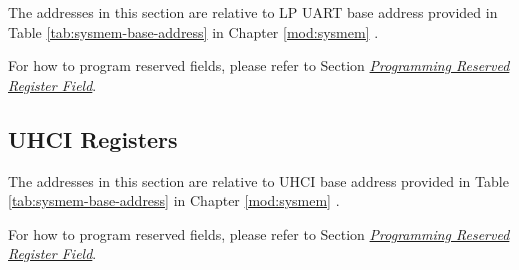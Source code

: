 \documentclass[main\_\_EN.tex]{subfiles}
\begin{document}
The addresses in this section are relative to LP UART base address provided in Table \ref{tab:sysmem-base-address} in Chapter \ref{mod:sysmem} \textit{}.

For how to program reserved fields, please refer to Section \hyperref[programming-reserved-field]{\textit{Programming Reserved Register Field}}.




\clearpage
\subsection{UHCI Registers}

The addresses in this section are relative to UHCI base address provided in Table \ref{tab:sysmem-base-address} in Chapter \ref{mod:sysmem} \textit{}.

For how to program reserved fields, please refer to Section \hyperref[programming-reserved-field]{\textit{Programming Reserved Register Field}}.


\end{document}
